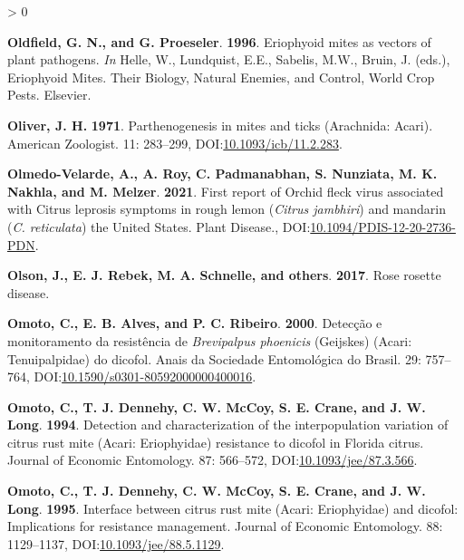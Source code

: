 \documentclass{ufdissertation}[overrideChapters] %
\newlength{\cslhangindent}
\newenvironment{CSLReferences}[2] %
 {%
  \setlength{\parindent}{0pt}
  \ifodd #1 \everypar{\setlength{\hangindent}{\cslhangindent}}\ignorespaces\fi
  \ifnum #2 > 0
  \setlength{\parskip}{#2\baselineskip}
  \fi
 }%
 {}
\begin{document}
{\begin{CSLReferences}{1}{1}
\leavevmode{}%
\textbf{Oldfield, G. N., and G. Proeseler}. \textbf{1996}. Eriophyoid mites as vectors of plant pathogens. \emph{In} Helle, W., Lundquist, E.E., Sabelis, M.W., Bruin, J. (eds.), Eriophyoid Mites. Their Biology, Natural Enemies, and Control, World Crop Pests. Elsevier.

\leavevmode{}%
\textbf{Oliver, J. H.} \textbf{1971}. Parthenogenesis in mites and ticks ({Arachnida}: {Acari}). American Zoologist. 11: 283--299, DOI:\href{https://doi.org/10.1093/icb/11.2.283}{10.1093/icb/11.2.283}.

\leavevmode{}%
\textbf{Olmedo-Velarde, A., A. Roy, C. Padmanabhan, S. Nunziata, M. K. Nakhla, and M. Melzer}. \textbf{2021}. First report of {Orchid fleck virus} associated with {Citrus leprosis} symptoms in rough lemon ({\emph{Citrus jambhiri}}) and mandarin ({\emph{C. reticulata}}) the {United States}. Plant Disease., DOI:\href{https://doi.org/10.1094/PDIS-12-20-2736-PDN}{10.1094/PDIS-12-20-2736-PDN}.

\leavevmode{}%
\textbf{Olson, J., E. J. Rebek, M. A. Schnelle, and others}. \textbf{2017}. Rose rosette disease.

\leavevmode{}%
\textbf{Omoto, C., E. B. Alves, and P. C. Ribeiro}. \textbf{2000}. Detec{ç}{ã}o e monitoramento da resist{ê}ncia de {\emph{Brevipalpus phoenicis}} ({Geijskes}) ({Acari}: {Tenuipalpidae}) do dicofol. Anais da Sociedade Entomol{ó}gica do Brasil. 29: 757--764, DOI:\href{https://doi.org/10.1590/s0301-80592000000400016}{10.1590/s0301-80592000000400016}.

\leavevmode{}%
\textbf{Omoto, C., T. J. Dennehy, C. W. McCoy, S. E. Crane, and J. W. Long}. \textbf{1994}. Detection and characterization of the interpopulation variation of citrus rust mite ({Acari}: {Eriophyidae}) resistance to dicofol in {Florida} citrus. Journal of Economic Entomology. 87: 566--572, DOI:\href{https://doi.org/10.1093/jee/87.3.566}{10.1093/jee/87.3.566}.

\leavevmode{}%
\textbf{Omoto, C., T. J. Dennehy, C. W. McCoy, S. E. Crane, and J. W. Long}. \textbf{1995}. Interface between citrus rust mite ({Acari}: {Eriophyidae}) and dicofol: Implications for resistance management. Journal of Economic Entomology. 88: 1129--1137, DOI:\href{https://doi.org/10.1093/jee/88.5.1129}{10.1093/jee/88.5.1129}.


\end{CSLReferences}}
\end{document}
